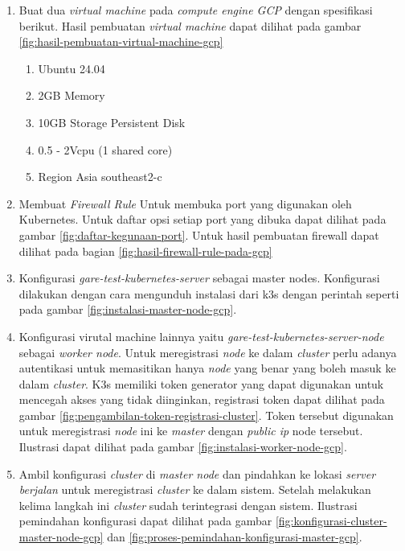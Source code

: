 \begin{enumerate}
  \item Buat dua \textit{virtual machine} pada \textit{compute engine GCP} dengan spesifikasi berikut. Hasil pembuatan \textit{virtual machine} dapat dilihat pada gambar \ref{fig:hasil-pembuatan-virtual-machine-gcp}
        \begin{enumerate}
          \item Ubuntu 24.04
          \item 2GB Memory
          \item 10GB Storage Persistent Disk
          \item 0.5 - 2Vcpu (1 shared core)
          \item Region Asia southeast2-c
        \end{enumerate}
  \item Membuat \textit{Firewall Rule} Untuk membuka port yang digunakan oleh Kubernetes. Untuk daftar opsi setiap port yang dibuka dapat dilihat pada gambar \ref{fig:daftar-kegunaan-port}. Untuk hasil pembuatan firewall dapat dilihat pada bagian \ref{fig:hasil-firewall-rule-pada-gcp}
  \item Konfigurasi \textit{gare-test-kubernetes-server} sebagai master nodes. Konfigurasi dilakukan dengan cara mengunduh instalasi dari k3s dengan perintah seperti pada gambar \ref{fig:instalasi-master-node-gcp}.
  \item Konfigurasi virutal machine lainnya yaitu \textit{gare-test-kubernetes-server-node} sebagai \textit{worker node}. Untuk meregistrasi \textit{node} ke dalam \textit{cluster} perlu adanya autentikasi untuk memasitikan hanya \textit{node} yang benar yang boleh masuk ke dalam \textit{cluster}. K3s memiliki token generator yang dapat digunakan untuk mencegah akses yang tidak diinginkan, registrasi token dapat dilihat pada gambar \ref{fig:pengambilan-token-registrasi-cluster}. Token tersebut digunakan untuk meregistrasi \textit{node} ini ke \textit{master} dengan \textit{public ip} node tersebut. Ilustrasi dapat dilihat pada gambar \ref{fig:instalasi-worker-node-gcp}.
  \item Ambil konfigurasi \textit{cluster} di \textit{master node} dan pindahkan ke lokasi \textit{server berjalan} untuk meregistrasi \textit{cluster} ke dalam sistem. Setelah melakukan kelima langkah ini \textit{cluster} sudah terintegrasi dengan sistem. Ilustrasi pemindahan konfigurasi dapat dilihat pada gambar \ref{fig:konfigurasi-cluster-master-node-gcp} dan \ref{fig:proses-pemindahan-konfigurasi-master-gcp}.
\end{enumerate}

